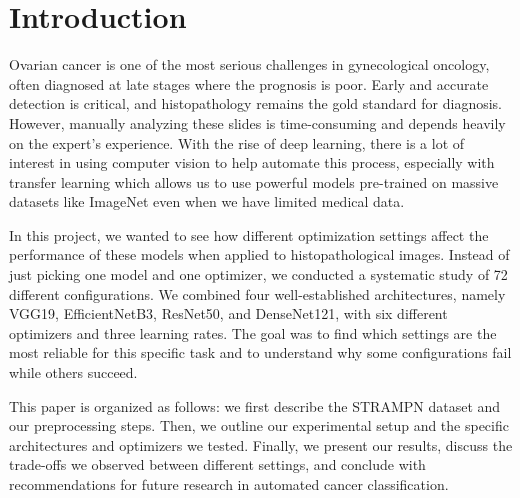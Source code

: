 \section{Introduction}
\label{sec:introduction}

Ovarian cancer is one of the most serious challenges in gynecological oncology, often diagnosed at late stages where the prognosis is poor. Early and accurate detection is critical, and histopathology remains the gold standard for diagnosis. However, manually analyzing these slides is time-consuming and depends heavily on the expert's experience. With the rise of deep learning, there is  a lot of interest in using computer vision to help automate this process, especially with transfer learning which allows us to use powerful models pre-trained on massive datasets like ImageNet even when we have limited medical data.

In this project, we wanted to see how different optimization settings affect the performance of these models when applied to histopathological images. Instead of just picking one model and one optimizer, we conducted a systematic study of 72 different configurations. We combined four well-established architectures, namely VGG19, EfficientNetB3, ResNet50, and DenseNet121, with six different optimizers and three learning rates. The goal was to find which settings are the most reliable for this specific task and to understand why some configurations fail while others succeed.

This paper is organized as follows: we first describe the STRAMPN dataset and our preprocessing steps. Then, we outline our experimental setup and the specific architectures and optimizers we tested. Finally, we present our results, discuss the trade-offs we observed between different settings, and conclude with recommendations for future research in automated cancer classification.
